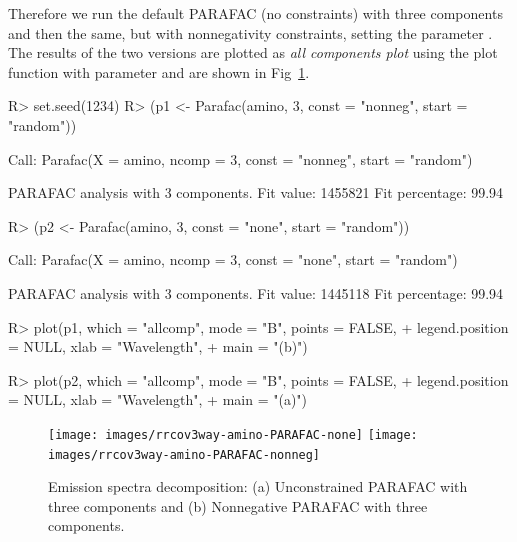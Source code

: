 \documentclass[article,shortnames, nojss]{jss}
\begin{document}
Therefore we run the default PARAFAC (no constraints)
with three components and then the same, but with nonnegativity constraints, setting the parameter
. The results of the two versions are plotted as \emph{all components plot}
using the plot function with parameter  and are
shown in Fig~\ref{fig-amino-PARAFAC}.
\begin{Schunk}
\begin{Sinput}
R> set.seed(1234)
R> (p1 <- Parafac(amino, 3, const = "nonneg", start = "random"))
\end{Sinput}
\begin{Soutput}
Call:
Parafac(X = amino, ncomp = 3, const = "nonneg", start = "random")


PARAFAC analysis with  3  components.
Fit value: 1455821 
Fit percentage: 99.94 %
\end{Soutput}
\begin{Sinput}
R> (p2 <- Parafac(amino, 3, const = "none", start = "random"))
\end{Sinput}
\begin{Soutput}
Call:
Parafac(X = amino, ncomp = 3, const = "none", start = "random")


PARAFAC analysis with  3  components.
Fit value: 1445118 
Fit percentage: 99.94 %
\end{Soutput}
\end{Schunk}
\begin{Schunk}
\begin{Sinput}
R> plot(p1, which = "allcomp", mode = "B", points = FALSE,
+      legend.position = NULL, xlab = "Wavelength",
+      main = "(b)")
\end{Sinput}
\end{Schunk}
\begin{Schunk}
\begin{Sinput}
R> plot(p2, which = "allcomp", mode = "B", points = FALSE,
+      legend.position = NULL, xlab = "Wavelength",
+      main = "(a)")
\end{Sinput}
\end{Schunk}
\begin{figure}[H]
\centering
\texttt{[image: images/rrcov3way-amino-PARAFAC-none]}
\texttt{[image: images/rrcov3way-amino-PARAFAC-nonneg]}
\caption{Emission spectra decomposition: (a) Unconstrained PARAFAC with three
components and (b) Nonnegative PARAFAC with three components.}
\label{fig-amino-PARAFAC}
\end{figure}
\end{document}
